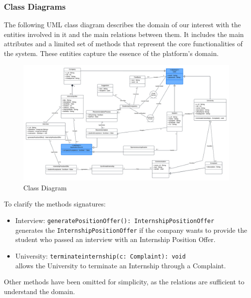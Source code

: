\subsubsection{Class Diagrams}
The following UML class diagram describes the domain of our interest with the entities involved in it and the main relations between them. It includes the main attributes and a limited set of methods that represent the core functionalities of the system. These entities capture the essence of the platform's domain.
\begin{figure}[H]
    \centering
    \includegraphics[width=\linewidth]{Latex/Images/ClassDiagram2.1.png}
    \caption{Class Diagram}
    \label{fig:ClassDiagram}
\end{figure}
To clarify the methods signatures:
\begin{itemize}
    \item Interview: \verb|generatePositionOffer(): InternshipPositionOffer| \\generates the \verb|InternshipPositionOffer| if the company wants to provide the student who passed an interview with an Internship Position Offer. 
    \item University: \verb|terminateinternship(c: Complaint): void| \\allows the University to terminate an Internship through a Complaint.
\end{itemize}
Other methods have been omitted for simplicity, as the relations are sufficient to understand the domain. 
\clearpage
